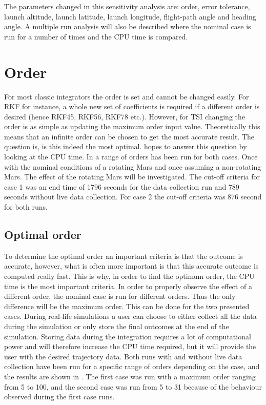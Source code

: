 \noindent
The parameters changed in this sensitivity analysis are: order, error tolerance, launch altitude, launch latitude, launch longitude, flight-path angle and heading angle. A multiple run analysis will also be described where the nominal case is run for a number of times and the CPU time is compared. 


\section{Order}
\label{sec:order}
For most classic integrators the order is set and cannot be changed easily. For \ac{RKF} for instance, a whole new set of coefficients is required if a different order is desired (hence \ac{RKF45}, \ac{RKF56}, \ac{RKF78} etc.). However, for \ac{TSI} changing the order is as simple as updating the maximum order input value. Theoretically this means that an infinite order can be chosen to get the most accurate result. The question is, is this indeed the most optimal.  hopes to answer this question by looking at the CPU time. In  a range of orders has been run for both cases. Once with the nominal conditions of a rotating Mars and once assuming a non-rotating Mars. The effect of the rotating Mars will be investigated. The cut-off criteria for case 1 was an end time of 1796 seconds for the data collection run and 789 seconds without live data collection. For case 2 the cut-off criteria was 876 second for both runs.

\subsection{Optimal order}
\label{subsec:optimalOrder}
To determine the optimal order an important criteria is that the outcome is accurate, however, what is often more important is that this accurate outcome is computed really fast. This is why, in order to find the optimum order, the CPU time is the most important criteria. In order to properly observe the effect of a different order, the nominal case is run for different orders. Thus the only difference will be the maximum order. This can be done for the two presented cases. During real-life simulations a user can choose to either collect all the data during the simulation or only store the final outcomes at the end of the simulation. Storing data during the integration requires a lot of computational power and will therefore increase the CPU time required, but it will provide the user with the desired trajectory data. Both runs with and without live data collection have been run for a specific range of orders depending on the case, and the results are shown in .
The first case was run with a maximum order ranging from 5 to 100, and the second case was run from 5 to 31 because of the behaviour observed during the first case runs. 



